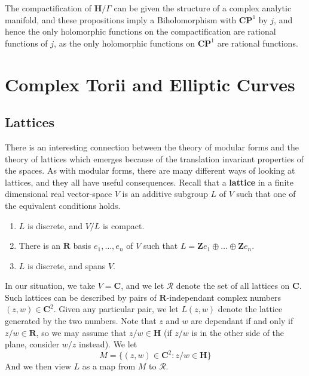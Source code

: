 The compactification of $\mathbf{H}/\Gamma$ can be given the structure of a complex analytic manifold, and these propositions imply a Biholomorphism with $\mathbf{C} \mathbf{P}^1$ by $j$, and hence the only holomorphic functions on the compactification are rational functions of $j$, as the only holomorphic functions on $\mathbf{C} \mathbf{P}^1$ are rational functions.










\chapter{Complex Torii and Elliptic Curves}

\section{Lattices}

There is an interesting connection between the theory of modular forms and the theory of lattices which emerges because of the translation invariant properties of the spaces. As with modular forms, there are many different ways of looking at lattices, and they all have useful consequences. Recall that a {\bf lattice} in a finite dimensional real vector-space $V$ is an additive subgroup $L$ of $V$ such that one of the equivalent conditions holds.
%
\begin{enumerate}
    \item $L$ is discrete, and $V/L$ is compact.
    \item There is an $\mathbf{R}$ basis $e_1, \dots, e_n$ of $V$ such that $L = \mathbf{Z} e_1 \oplus \dots \oplus \mathbf{Z} e_n$.
    \item $L$ is discrete, and spans $V$.
\end{enumerate}
%
In our situation, we take $V = \mathbf{C}$, and we let $\mathcal{R}$ denote the set of all lattices on $\mathbf{C}$. Such lattices can be described by pairs of $\mathbf{R}$-independant complex numbers $(z,w) \in \mathbf{C}^2$. Given any particular pair, we let $L(z,w)$ denote the lattice generated by the two numbers. Note that $z$ and $w$ are dependant if and only if $z/w \in \mathbf{R}$, so we may assume that $z/w \in \mathbf{H}$ (if $z/w$ is in the other side of the plane, consider $w/z$ instead). We let
%
\[ M = \{ (z,w) \in \mathbf{C}^2 : z/w \in \mathbf{H} \} \]
%
And we then view $L$ as a map from $M$ to $\mathcal{R}$.


